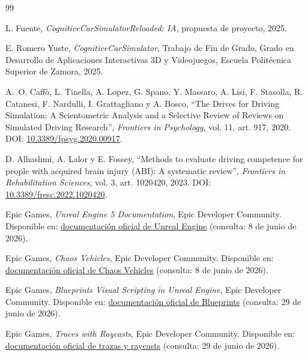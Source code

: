 \begin{sloppypar}
\raggedright%
\begin{thebibliography}{99}
%

L. Fuente, \textit{CognitiveCarSimulatorReloaded: IA}, propuesta de proyecto, 2025.

E. Romero Yuste, \textit{CognitiveCarSimulator}, Trabajo de Fin de Grado, Grado en Desarrollo de Aplicaciones Interactivas 3D y Videojuegos, Escuela Politécnica Superior de Zamora, 2025.

A.~O. Caffò, L. Tinella, A. Lopez, G. Spano, Y. Massaro, A. Lisi, F. Stasolla, R. Catanesi, F. Nardulli, I. Grattagliano y A. Bosco, ``The Drives for Driving Simulation: A Scientometric Analysis and a Selective Review of Reviews on Simulated Driving Research'', \textit{Frontiers in Psychology}, vol. 11, art. 917, 2020. DOI\@: \href{https://doi.org/10.3389/fpsyg.2020.00917}{10.3389/fpsyg.2020.00917}.

D. Alhashmi, A. Lalor y E. Fossey, ``Methods to evaluate driving competence for people with acquired brain injury (ABI): A systematic review'', \textit{Frontiers in Rehabilitation Sciences}, vol. 3, art. 1020420, 2023. DOI\@: \href{https://doi.org/10.3389/fresc.2022.1020420}{10.3389/fresc.2022.1020420}.

Epic Games, \textit{Unreal Engine 5 Documentation}, Epic Developer Community. Disponible en: \href{https://dev.epicgames.com/documentation/en-us/unreal-engine/}{documentación oficial de Unreal Engine} (consulta: 8 de junio de 2026).

Epic Games, \textit{Chaos Vehicles}, Epic Developer Community. Disponible en: \href{https://dev.epicgames.com/documentation/unreal-engine/chaos-vehicles}{documentación oficial de Chaos Vehicles} (consulta: 8 de junio de 2026).

Epic Games, \textit{Blueprints Visual Scripting in Unreal Engine}, Epic Developer Community. Disponible en: \href{https://dev.epicgames.com/documentation/en-us/unreal-engine/blueprints-visual-scripting-in-unreal-engine}{documentación oficial de Blueprints} (consulta: 29 de junio de 2026).

Epic Games, \textit{Traces with Raycasts}, Epic Developer Community. Disponible en: \href{https://dev.epicgames.com/documentation/en-us/unreal-engine/traces-with-raycasts-in-unreal-engine}{documentación oficial de trazas y raycasts} (consulta: 29 de junio de 2026).


\end{thebibliography}
\end{sloppypar}
